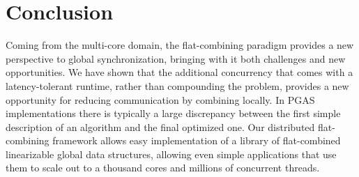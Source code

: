 \section{Conclusion}
Coming from the multi-core domain, the flat-combining paradigm provides a new perspective to global synchronization, bringing with it both challenges and new opportunities.
We have shown that the additional concurrency that comes with a latency-tolerant runtime, rather than compounding the problem, provides a new opportunity for reducing communication by combining locally.
In PGAS implementations there is typically a large discrepancy between the first simple description of an algorithm and the final optimized one.
Our distributed flat-combining framework allows easy implementation of a library of flat-combined linearizable global data structures, allowing even simple applications that use them to scale out to a thousand cores and millions of concurrent threads.
